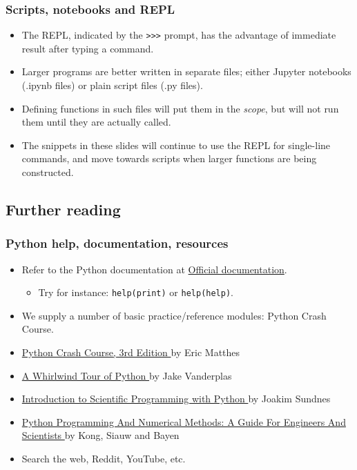 \begin{frame}[fragile]
  \frametitle{Scripts, notebooks and REPL}
  \begin{itemize}
    \item The REPL, indicated by the \lstinline|>>>| prompt, has the advantage of immediate result after typing a command.
    \item Larger programs are better written in separate files; either Jupyter notebooks (.ipynb files) or plain script files (.py files).
    \item Defining functions in such files will put them in the \emph{scope}, but will not run them until they are actually called.
    \item The snippets in these slides will continue to use the REPL for single-line commands, and move towards scripts when larger functions are being constructed.
  \end{itemize}
\end{frame}

\subsection{Further reading}
\begin{frame}[fragile]
\frametitle{Python help, documentation, resources}
\begin{itemize}[<+->]
  \item Refer to the Python documentation at \href{https://docs.python.org/3/}{Official documentation}.
  \begin{itemize}
    \item Try for instance: \lstinline$help(print)$ or \lstinline$help(help)$.
  \end{itemize}
  \item We supply a number of basic practice/reference modules: Python Crash Course.
  \item \href{https://tue.on.worldcat.org/oclc/1346554335}{Python Crash Course, 3rd Edition \faExternalLink} by Eric Matthes
  \item \href{https://tue.on.worldcat.org/oclc/1023864062}{A Whirlwind Tour of Python \faExternalLink} by Jake Vanderplas
  \item \href{https://tue.on.worldcat.org/oclc/1164494156}{Introduction to Scientific Programming with Python \faExternalLink} by Joakim Sundnes
  \item \href{https://pythonnumericalmethods.berkeley.edu/notebooks/Index.html}{Python Programming And Numerical Methods: A Guide For Engineers And Scientists \faExternalLink} by Kong, Siauw and Bayen
  \item Search the web, Reddit, YouTube, etc.
\end{itemize}
\end{frame}

